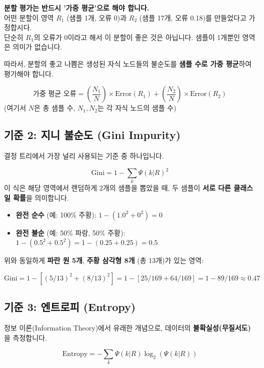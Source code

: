 \documentclass[11pt,a4paper]{book}
\theoremstyle{definition}
\begin{document}
\begin{warningbox}
    \textbf{분할 평가는 반드시 '가중 평균'으로 해야 합니다.} \\
    어떤 분할이 영역 $R_1$ (샘플 1개, 오류 0)과 $R_2$ (샘플 17개, 오류 0.18)를 만들었다고 가정합시다. \\
    단순히 $R_1$의 오류가 0이라고 해서 이 분할이 좋은 것은 아닙니다. 샘플이 1개뿐인 영역은 의미가 없습니다.

    따라서, 분할의 좋고 나쁨은 생성된 자식 노드들의 불순도를 \textbf{샘플 수로 가중 평균}하여 평가해야 합니다.

    $$ \text{가중 평균 오류} = \left(\frac{N_1}{N}\right) \times \text{Error}(R_1) + \left(\frac{N_2}{N}\right) \times \text{Error}(R_2) $$
    (여기서 $N$은 총 샘플 수, $N_1, N_2$는 각 자식 노드의 샘플 수)
\end{warningbox}

\subsection{기준 2: 지니 불순도 (Gini Impurity)}
결정 트리에서 가장 널리 사용되는 기준 중 하나입니다.

$$ \text{Gini} = 1 - \sum_{k} \Psi(k|R)^2 $$
이 식은 해당 영역에서 랜덤하게 2개의 샘플을 뽑았을 때, 두 샘플이 \textbf{서로 다른 클래스일 확률}을 의미합니다.

\begin{itemize}
    \item \textbf{완전 순수} (예: 100\% 주황): $1 - (1.0^2 + 0^2) = 0$
    \item \textbf{완전 불순} (예: 50\% 파랑, 50\% 주황): $1 - (0.5^2 + 0.5^2) = 1 - (0.25 + 0.25) = 0.5$
\end{itemize}

\begin{examplebox}
    위와 동일하게 \textbf{파란 원 5개}, \textbf{주황 삼각형 8개} (총 13개)가 있는 영역:
    
    $\text{Gini} = 1 - \left[ (5/13)^2 + (8/13)^2 \right] = 1 - \left[ 25/169 + 64/169 \right] = 1 - 89/169 \approx 0.47$
\end{examplebox}

\subsection{기준 3: 엔트로피 (Entropy)}
정보 이론(Information Theory)에서 유래한 개념으로, 데이터의 \textbf{불확실성(무질서도)}을 측정합니다.

$$ \text{Entropy} = - \sum_{k} \Psi(k|R) \log_{2}(\Psi(k|R)) $$
\end{document}
